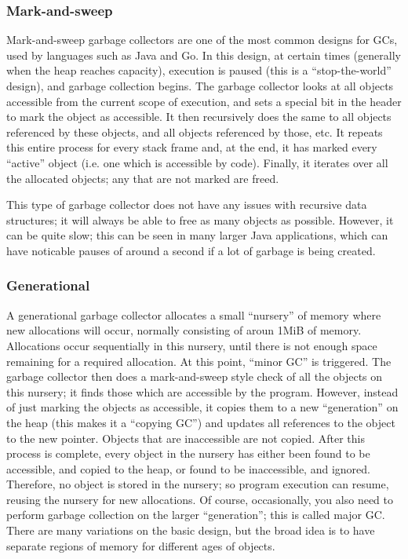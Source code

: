 \documentclass[9pt]{extarticle}
\begin{document}
\subsubsection{Mark-and-sweep}

Mark-and-sweep garbage collectors are one of the most common designs for
GCs, used by languages such as Java and Go. In this design, at certain
times (generally when the heap reaches capacity), execution is paused
(this is a ``stop-the-world'' design), and garbage collection begins.
The garbage collector looks at all objects accessible from the current
scope of execution, and sets a special bit in the header to mark the
object as accessible. It then recursively does the same to all objects
referenced by these objects, and all objects referenced by those, etc.
It repeats this entire process for every stack frame and, at the end, it
has marked every ``active'' object (i.e. one which is accessible by
code). Finally, it iterates over all the allocated objects; any that are
not marked are freed.

This type of garbage collector does not have any issues with recursive
data structures; it will always be able to free as many objects as
possible. However, it can be quite slow; this can be seen in many larger
Java applications, which can have noticable pauses of around a second if
a lot of garbage is being created.

\subsubsection{Generational}

A generational garbage collector allocates a small ``nursery'' of memory
where new allocations will occur, normally consisting of aroun 1MiB of
memory. Allocations occur sequentially in this nursery, until there is
not enough space remaining for a required allocation. At this point,
``minor GC'' is triggered. The garbage collector then does a
mark-and-sweep style check of all the objects on this nursery; it finds
those which are accessible by the program. However, instead of just
marking the objects as accessible, it copies them to a new
``generation'' on the heap (this makes it a ``copying GC'') and updates
all references to the object to the new pointer. Objects that are
inaccessible are not copied. After this process is complete, every
object in the nursery has either been found to be accessible, and copied
to the heap, or found to be inaccessible, and ignored. Therefore, no
object is stored in the nursery; so program execution can resume,
reusing the nursery for new allocations. Of course, occasionally, you
also need to perform garbage collection on the larger ``generation'';
this is called major GC. There are many variations on the basic design,
but the broad idea is to have separate regions of memory for different
ages of objects.
\end{document}
